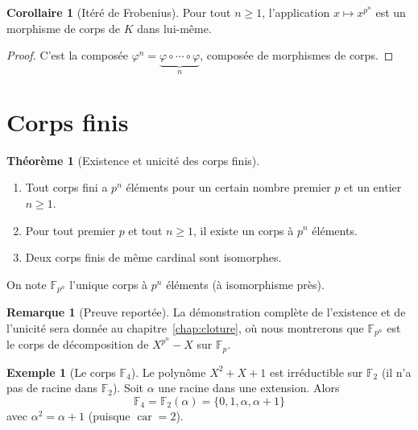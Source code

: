 \documentclass[12pt,a4paper,openany]{book}
\theoremstyle{definition}
\newtheorem{theoreme}{Théorème}[chapter]
\newtheorem{corollaire}{Corollaire}[chapter]
\newtheorem{remarque}{Remarque}[chapter]
\newtheorem{exemple}{Exemple}[chapter]
\newcommand{\F}{\mathbb{F}}
\newcommand{\car}{\operatorname{car}}
\begin{document}
\begin{corollaire}[Itéré de Frobenius]\label{cor:frobenius-itere}
Pour tout $n \geq 1$, l'application $x \mapsto x^{p^n}$ est un morphisme de
corps de $K$ dans lui-même.
\end{corollaire}

\begin{proof}
C'est la composée $\varphi^n = \underbrace{\varphi \circ \cdots \circ \varphi}_{n}$,
composée de morphismes de corps.
\end{proof}

\section{Corps finis}
\label{sec:corps-finis}

\begin{theoreme}[Existence et unicité des corps finis]\label{thm:corps-finis}
\begin{enumerate}[label=(\roman*)]
  \item Tout corps fini a $p^n$ éléments pour un certain nombre premier $p$ et
    un entier $n \geq 1$.
  \item Pour tout premier $p$ et tout $n \geq 1$, il existe un corps à $p^n$
    éléments.
  \item Deux corps finis de même cardinal sont isomorphes.
\end{enumerate}
On note $\F_{p^n}$\index{F_{p^n}@$\F_{p^n}$} l'unique corps à $p^n$ éléments
(à isomorphisme près).
\end{theoreme}

\begin{remarque}[Preuve reportée]
\label{rem:corps-finis-preuve}
La démonstration complète de l'existence et de l'unicité sera donnée au
chapitre~\ref{chap:cloture}, où nous montrerons que $\F_{p^n}$ est le corps
de décomposition de $X^{p^n} - X$ sur $\F_p$.
\end{remarque}

\begin{exemple}[Le corps $\F_4$]\label{ex:F4}
Le polynôme $X^2 + X + 1$ est irréductible sur $\F_2$ (il n'a pas de racine
dans $\F_2$). Soit $\alpha$ une racine dans une extension. Alors
\[
  \F_4 = \F_2(\alpha) = \{0, 1, \alpha, \alpha + 1\}
\]
avec $\alpha^2 = \alpha + 1$ (puisque $\car = 2$).
\end{exemple}

\end{document}
